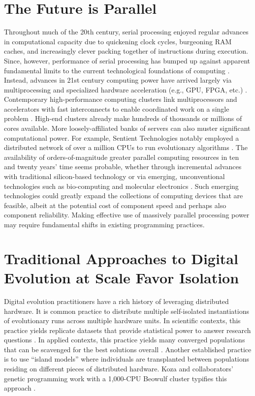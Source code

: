 \section{The Future is Parallel}

Throughout much of the 20th century, serial processing enjoyed regular advances in computational capacity due to quickening clock cycles, burgeoning RAM caches, and increasingly clever packing together of instructions during execution.
Since, however, performance of serial processing has bumped up against apparent fundamental limits to the current technological foundations of computing \citep{sutter2005free}.
Instead, advances in 21st century computing power have arrived largely via multiprocessing \citep[p.~55]{hennessy2011computer} and specialized hardware acceleration (e.g., GPU, FPGA, etc.) \citep{che2008accelerating}.
Contemporary high-performance computing clusters link multiprocessors and accelerators with fast interconnects to enable coordinated work on a single problem \citep[p.~436]{hennessy2011computer}.
High-end clusters already make hundreds of thousands or millions of cores available.
More loosely-affiliated banks of servers can also muster significant computational power.
For example, Sentient Technologies notably employed a distributed network of over a million CPUs to run evolutionary algorithms \citep{miikkulainen2019evolving}.
The availability of orders-of-magnitude greater parallel computing resources in ten and twenty years’ time seems probable, whether through incremental advances with traditional silicon-based technology \citep{gropp2013programming,dongarra2014applied} or via emerging, unconventional technologies such as bio-computing \citep{benenson2009biocomputers} and molecular electronics \citep{xiang2016molecular}.
Such emerging technologies could greatly expand the collections of computing devices that are feasible, albeit at the potential cost of component speed \citep{bonnet2013amplifying, ellenbogen2000architectures} and perhaps also component reliability.
Making effective use of massively parallel processing power may require fundamental shifts in existing programming practices.

\section{Traditional Approaches to Digital Evolution at Scale Favor Isolation}

Digital evolution practitioners have a rich history of leveraging distributed hardware.
It is common practice to distribute multiple self-isolated instantiations of evolutionary runs across multiple hardware units.
In scientific contexts, this practice yields replicate datasets that provide statistical power to answer research questions \citep{dolson2017spatial}.
In applied contexts, this practice yields many converged populations that can be scavenged for the best solutions overall \citep{hornby2006automated}.
Another established practice is to use ``island models'' where individuals are transplanted between populations residing on different pieces of distributed hardware.
Koza and collaborators’ genetic programming work with a 1,000-CPU Beowulf cluster typifies this approach \citep{bennett1999building}.

